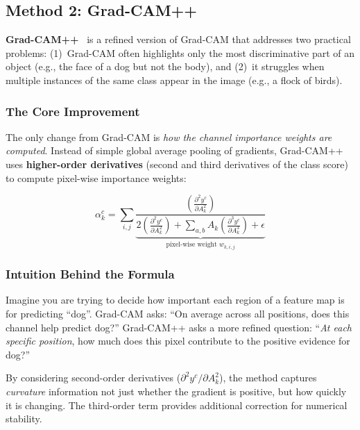 \documentclass[12pt, a4paper]{article}
\begin{document}
\subsection{Method 2: Grad-CAM++}

\textbf{Grad-CAM++}~\cite{chattopadhay2018gradcampp} is a refined version of
Grad-CAM that addresses two practical problems: (1)~Grad-CAM often highlights
only the most discriminative part of an object (e.g., the face of a dog but not
the body), and (2)~it struggles when multiple instances of the same class appear
in the image (e.g., a flock of birds).

\subsubsection{The Core Improvement}

The only change from Grad-CAM is \emph{how the channel importance weights are
computed}.  Instead of simple global average pooling of gradients, Grad-CAM++
uses \textbf{higher-order derivatives} (second and third derivatives of the
class score) to compute pixel-wise importance weights:

\begin{equation}
\alpha_k^c = \sum_{i,j} \underbrace{\frac{\left(\frac{\partial^2 y^c}{\partial A_k^2}\right)}
{2 \left(\frac{\partial^2 y^c}{\partial A_k^2}\right) +
\sum_{a,b} A_k \left(\frac{\partial^3 y^c}{\partial A_k^3}\right) + \epsilon}}_{\text{pixel-wise weight } w_{k,i,j}}
\end{equation}

\subsubsection{Intuition Behind the Formula}

Imagine you are trying to decide how important each region of a feature map is
for predicting ``dog''.  Grad-CAM asks: ``On average across all positions, does
this channel help predict dog?''  Grad-CAM++ asks a more refined question:
``\emph{At each specific position}, how much does this pixel contribute to the
positive evidence for dog?''

By considering second-order derivatives ($\partial^2 y^c / \partial A_k^2$),
the method captures \emph{curvature} information not just whether the
gradient is positive, but how quickly it is changing.  The third-order term
provides additional correction for numerical stability.
\end{document}

